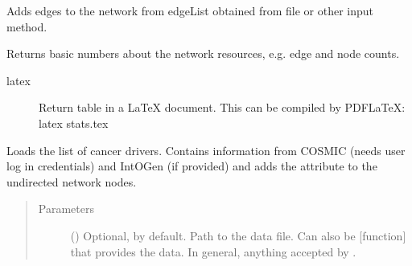 \documentclass[letterpaper,10pt,english]{sphinxmanual}
\begin{document}
\begin{fulllineitems}

\begin{fulllineitems}
\label{\detokenize{main:pypath.main.PyPath.attach_network}}
Adds edges to the network from edgeList obtained from file or
other input method.

\end{fulllineitems}


\begin{fulllineitems}
\label{\detokenize{main:pypath.main.PyPath.basic_stats}}
Returns basic numbers about the network resources, e.g. edge and
node counts.
\begin{description}
\item[{latex}] \leavevmode
Return table in a LaTeX document. This can be compiled by
PDFLaTeX:
latex stats.tex

\end{description}

\end{fulllineitems}


\begin{fulllineitems}
\label{\detokenize{main:pypath.main.PyPath.basic_stats_intergroup}}
\end{fulllineitems}


\begin{fulllineitems}
\label{\detokenize{main:pypath.main.PyPath.cancer_drivers_list}}
Loads the list of cancer drivers. Contains information from
COSMIC (needs user log in credentials) and IntOGen (if provided)
and adds the attribute to the undirected network nodes.
\begin{quote}\begin{description}
\item[{Parameters}] \leavevmode
{} () \textendash{} Optional,  by default. Path to the data file. Can
also be {[}function{]} that provides the data. In general,
anything accepted by
.


\end{description}
\end{quote}
\end{fulllineitems}
\end{fulllineitems}
\end{document}
